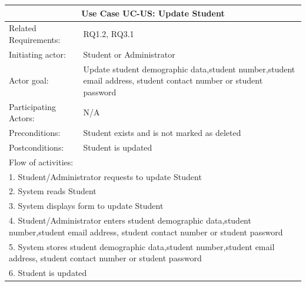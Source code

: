 \documentclass[12pt]{article}
\begin{document}
{		\begin{tabular}{| l | p{10cm}| }
			\hline\multicolumn{2}{|c|}{ \textbf{Use Case UC-US: Update Student}} \\ \hline
			Related Requirements: & RQ1.2, RQ3.1 \\ \hline
			Initiating actor: & Student or Administrator \\ \hline
			Actor goal: & Update student demographic data,student number,student email address, student contact number or student password\\ \hline
			Participating Actors: & N/A\\ \hline
			Preconditions: & Student exists and is not marked as deleted\\ \hline
			Postconditions: & Student is updated\\ \hline
			\multicolumn{2}{|l|}{Flow of activities:}\\ \hline
			\multicolumn{2}{|p{15cm}|}{1. Student/Administrator requests to update Student}\\
			\multicolumn{2}{|p{15cm}|}{2. System reads Student}\\
			\multicolumn{2}{|p{15cm}|}{3. System displays form to update Student}\\
			\multicolumn{2}{|p{15cm}|}{4. Student/Administrator enters student demographic data,student number,student email address, student contact number or student password}	\\		
			\multicolumn{2}{|p{15cm}|}{5. System stores student demographic data,student number,student email address, student contact number or student password}\\
			\multicolumn{2}{|l|}{6. Student is updated}	
			\\ \hline		
		\end{tabular}
		
		
		
	
		
		\begin{tabular}{| l | l| }
		

\end{tabular}}
\end{document}
